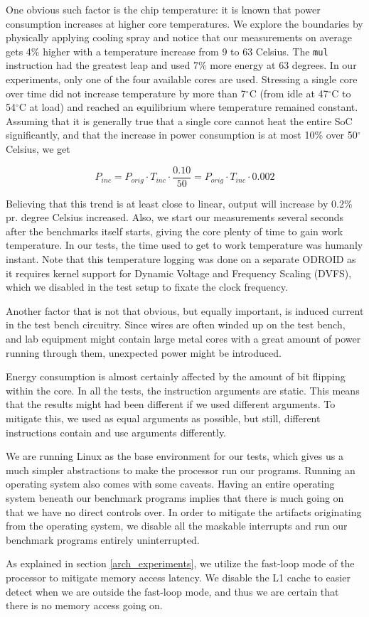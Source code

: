 \label{sec:temperature}
One obvious such factor is the chip temperature: it is known that power
consumption increases at higher core temperatures. We explore the boundaries by
physically applying cooling spray and notice that our measurements on average
gets 4\% higher with a temperature increase from 9 to 63 Celsius. The
\texttt{mul} instruction had the greatest leap and used 7\% more energy at 63
degrees. In our experiments, only one of the four available cores are used.
Stressing a single core over time did not increase temperature by more than
7$^\circ$C (from idle at 47$^\circ$C to 54$^\circ$C at load) and reached an
equilibrium where temperature remained constant. Assuming that it is generally
true that a single core cannot heat the entire SoC significantly, and that the
increase in power consumption is at most 10\% over 50$^\circ$ Celsius, we get

\begin{equation}
    P_{inc} = P_{orig} \cdot T_{inc} \cdot \frac{0.10}{50} = P_{orig} \cdot T_{inc} \cdot 0.002
\end{equation}

Believing that this trend is at least close to linear, output will increase by
0.2\% pr. degree Celsius increased. Also, we start our measurements several
seconds after the benchmarks itself starts, giving the core plenty of time to
gain work temperature. In our tests, the time used to get to work temperature
was humanly instant. Note that this temperature logging was done on a separate
ODROID as it requires kernel support for Dynamic Voltage and Frequency Scaling
(DVFS), which we disabled in the test setup to fixate the clock frequency.

Another factor that is not that obvious, but equally important, is induced current
in the test bench circuitry. Since wires are often winded up on the test
bench, and lab equipment might contain large metal cores with a great amount of
power running through them, unexpected power might be introduced.

Energy consumption is almost certainly affected by the amount of bit flipping
within the core. In all the tests, the instruction arguments are static. This
means that the results might had been different if we used different
arguments. To mitigate this, we used as equal arguments as possible, but still,
different instructions contain and use arguments differently.

We are running Linux as the base environment for our tests, which gives us a
much simpler abstractions to make the processor run our programs. Running an
operating system also comes with some caveats. Having an entire operating system
beneath our benchmark programs implies that there is much going on that we have
no direct controls over. In order to mitigate the artifacts originating from the
operating system, we disable all the maskable interrupts and run our benchmark
programs entirely uninterrupted.

As explained in section \autoref{arch_experiments}, we utilize the fast-loop mode of
the processor to mitigate memory access latency. We disable the L1 cache to
easier detect when we are outside the fast-loop mode, and thus we are certain
that there is no memory access going on.
